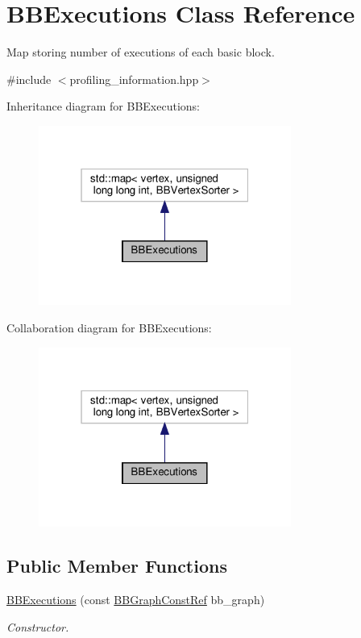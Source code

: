 \hypertarget{classBBExecutions}{}\section{B\+B\+Executions Class Reference}
\label{classBBExecutions}


Map storing number of executions of each basic block.  




{\ttfamily \#include $<$profiling\+\_\+information.\+hpp$>$}



Inheritance diagram for B\+B\+Executions\+:
\nopagebreak
\begin{figure}[H]
\begin{center}
\leavevmode
\includegraphics[width=235pt]{d4/d2f/classBBExecutions__inherit__graph}
\end{center}
\end{figure}


Collaboration diagram for B\+B\+Executions\+:
\nopagebreak
\begin{figure}[H]
\begin{center}
\leavevmode
\includegraphics[width=235pt]{d8/dc6/classBBExecutions__coll__graph}
\end{center}
\end{figure}
\subsection*{Public Member Functions}
\begin{DoxyCompactItemize}
\item 
\hyperlink{classBBExecutions_a1278ac026fd00d35e001ffd01ffb1f38}{B\+B\+Executions} (const \hyperlink{basic__block_8hpp_ab66bdbde3a29e41d079d8a320af9c921}{B\+B\+Graph\+Const\+Ref} bb\+\_\+graph)
\begin{DoxyCompactList}\small\item\em Constructor. \end{DoxyCompactList}\end{DoxyCompactItemize}


